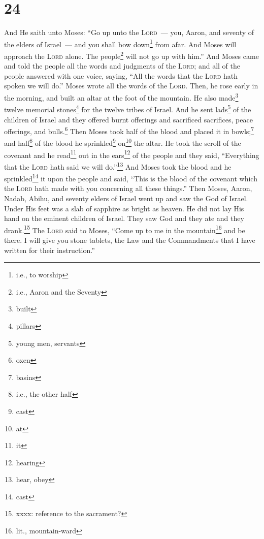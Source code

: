 \section{24}
\begin{enumerate}[align=center]
     And He saith unto Moses: ``Go up unto the \textsc{Lord}~--- you, Aaron, and seventy of the elders of Israel~--- and you shall bow down\footnote{i.e., to worship} from afar.%
     And Moses will approach the \textsc{Lord} alone. The people\footnote{i.e., Aaron and the Seventy} will not go up with him.''%
     And Moses came and told the people all the words and judgments of the \textsc{Lord}; and all of the people answered with one voice, saying, ``All the words that the \textsc{Lord} hath spoken we will do.''%
     Moses wrote all the words of the \textsc{Lord}. Then, he rose early in the morning, and built an altar at the foot of the mountain. He also made\footnote{built} twelve memorial stones\footnote{pillars} for the twelve tribes of Israel.%
     And he sent lads\footnote{young men, servants} of the children of Israel and they offered burnt offerings and sacrificed sacrifices, peace offerings, and bulls.\footnote{oxen}%
     Then Moses took half of the blood and placed it in bowls;\footnote{basins} and half\footnote{i.e., the other half} of the blood he sprinkled\footnote{cast} on\footnote{at} the altar.%
     He took the scroll of the covenant and he read\footnote{it} out in the ears\footnote{hearing} of the people and they said, ``Everything that the \textsc{Lord} hath said we will do.''\footnote{hear, obey}%
     And Moses took the blood and he sprinkled\footnote{cast} it upon the people and said, ``This is the blood of the covenant which the \textsc{Lord} hath made with you concerning all these things.''%
     Then Moses, Aaron, Nadab, Abihu, and seventy elders of Israel went up%
     and saw the God of Israel. Under His feet was a slab of sapphire as bright as heaven.%
     He did not lay His hand on the eminent children of Israel. They saw God and they ate and they drank.\footnote{xxxx: reference to the sacrament?}%
     The \textsc{Lord} said to Moses, ``Come up to me in the mountain\footnote{lit., mountain-ward} and be there. I will give you stone tablets, the Law and the Commandments that I have written for their instruction.''%

\end{enumerate}

